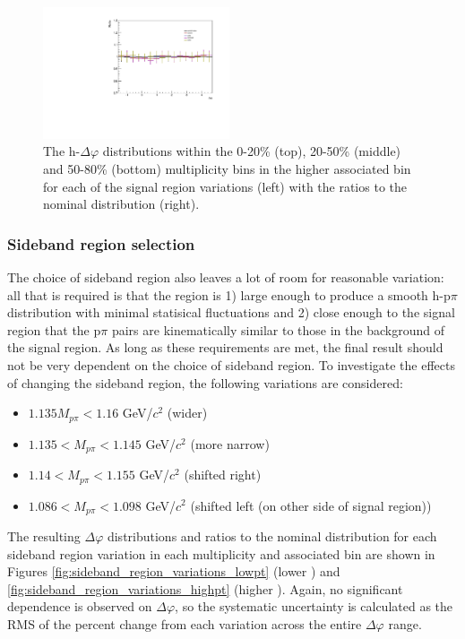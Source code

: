 \begin{figure}[ht]
    \includegraphics[width=0.49\textwidth]{figures/analysis/signal_variations_dphi_50_80_highpt_ratio.pdf}
    \caption{The h-\lmb $\Delta\varphi$ distributions within the 0-20\% (top), 20-50\% (middle) and 50-80\% (bottom) multiplicity bins in the higher associated \pt bin for each of the signal region variations (left) with the ratios to the nominal distribution (right).}
    \label{fig:signal_region_variations_highpt}
\end{figure}

\subsubsection{Sideband region selection}
The choice of sideband region also leaves a lot of room for reasonable variation: all that is required is that the region is 1) large enough to produce a smooth h-p$\pi$ distribution with minimal statisical fluctuations and 2) close enough to the signal region that the p$\pi$ pairs are kinematically similar to those in the background of the signal region. As long as these requirements are met, the final result should not be very dependent on the choice of sideband region. To investigate the effects of changing the sideband region, the following variations are considered:
%
\begin{itemize}
\item $1.135 M_{p\pi} < 1.16$ GeV/$c^2$ (wider)
\item $1.135 < M_{p\pi} < 1.145$ GeV/$c^2$ (more narrow)
\item $1.14 < M_{p\pi} < 1.155$ GeV/$c^2$ (shifted right)
\item $1.086 < M_{p\pi} < 1.098$ GeV/$c^2$ (shifted left (on other side of signal region))
\end{itemize}
%
The resulting $\Delta\varphi$ distributions and ratios to the nominal distribution for each sideband region variation in each multiplicity and associated \pt bin are shown in Figures \ref{fig:sideband_region_variations_lowpt} (lower \pt) and \ref{fig:sideband_region_variations_highpt} (higher \pt). Again, no significant dependence is observed on $\Delta\varphi$, so the systematic uncertainty is calculated as the RMS of the percent change from each variation across the entire $\Delta\varphi$ range.

